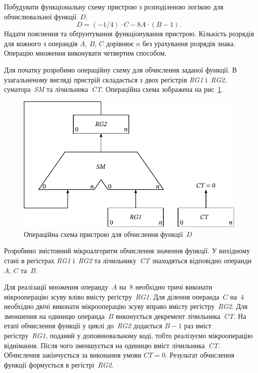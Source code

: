 \documentclass[a4paper,oneside,DIV=12,12pt]{scrartcl}
\newcommand{\schel}[1]{\textit{#1}}
\begin{document}
	\begin{exercise}
		Побудувати функціональну схему пристрою з розподіленою логікою для обчислювальної функції~$D$.
		\[
			D = (-1 / 4) \cdot C - 8A \cdot (B - 1).
		\]
		Надати пояснення та обґрунтування функціонування пристрою. Кількість розрядів для кожного з операндів $A$, $B$, $C$ дорівнює $n$ без урахування розрядів знака. Операцію множення виконувати четвертим способом.
	\end{exercise}
	
	\begin{solution}
		Для початку розробимо операційну схему для обчислення заданої функції. В узагальненому вигляді пристрій складається з двох регістрів \schel{RG1} і~\schel{RG2}, суматора~\schel{SM} та лічильника~\schel{CT}. Операційна схема зображена на рис~\ref{fig:task-3-operation-scheme-01}.
		
		\begin{figure}[!htbp]
		\centering
			\includegraphics[height = 12\baselineskip]{assets/task-3-01-operation-scheme.pdf}
		\caption{Операційна схема пристрою для обчислення функції~$D$}
		\label{fig:task-3-operation-scheme-01}
		\end{figure}
		
		Розробимо змістовний мікроалгоритм обчислення значення функції. У вихідному стані в регістрах \schel{RG1} і~\schel{RG2} та лічильнику~\schel{CT} знаходяться відповідно операнди $A$, $C$ та~$B$.
		
		Для реалізації множення операнду~$A$ на~$8$ необхідно тричі виконати мікрооперацію зсуву вліво вмісту регістру~\schel{RG1}. Для ділення операнда~$C$ на~$4$ необхідно двічі виконати мікрооперацію зсуву вправо вмісту регістру~\schel{RG2}. Для зменшення на одиницю операнда~$B$ виконується декремент лічильника~\schel{CT}. На етапі обчислення функції у циклі до~\schel{RG2} додається $B - 1$ раз вміст регістру~\schel{RG1}, поданий у доповнювальному коді, тобто реалізуємо мікрооперацію віднімання. Після чого зменшується на одиницю вміст лічильника~\schel{CT}. Обчислення закінчується за виконання умови $CT = 0$. Результат обчислення функції формується в регістрі~\schel{RG2}.
	

\end{solution}
\end{document}
